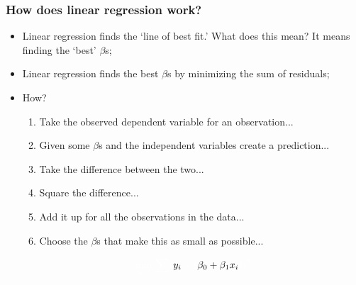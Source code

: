 \documentclass[aspectratio=169]{beamer}
\theoremstyle{principle}
\begin{document}
\begin{frame}
\frametitle{How does linear regression work?}

\begin{itemize}
\item Linear regression finds the `line of best fit.'  What does this mean?  It means finding the `best' $\beta$s;
\bigskip

\item Linear regression finds the best $\beta$s by minimizing the sum of residuals;
\bigskip

\item How?
\begin{enumerate}
\item Take the observed dependent variable for an observation...
\item Given some $\beta$s and the independent variables create a prediction...
\item[]\color{white} Take the difference between the two...
\item[]\color{white} Square the difference...
\item[]\color{white} Add it up for all the observations in the data...
\item[]\color{white} Choose the $\beta$s that make this as small as possible...
\end{enumerate}
\begin{align*}
\color{white}\min_{\beta_0,\beta_1}\sum_i(\color{black}y_i\color{white} - (\color{black}\beta_0 + \beta_1 x_i\color{white}))^2
\end{align*}
\end{itemize}

\end{frame}
\end{document}
